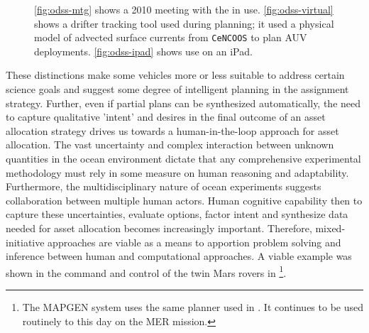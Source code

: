 \begin{figure}
\centering
{}
\caption{\small \ref{fig:odss-mtg} shows a 2010 \can meeting with the
  \od in use. \ref{fig:odss-virtual} shows a drifter tracking tool
  used during \can planning; it used a physical model of advected
  surface currents from \texttt{CeNCOOS} \cite{cencoos} to plan AUV
  deployments. \ref{fig:odss-ipad} shows \od use on an iPad.}
\label{fig:odss2}
\end{figure}


These distinctions make some vehicles more or less suitable to address
certain science goals and suggest some degree of intelligent planning
in the assignment strategy. Further, even if partial plans can be
synthesized automatically, the need to capture qualitative 'intent'
and desires in the final outcome of an asset allocation strategy
drives us towards a human-in-the-loop approach for asset
allocation. The vast uncertainty and complex interaction between
unknown quantities in the ocean environment dictate that any
comprehensive experimental methodology must rely in some measure on
human reasoning and adaptability.  Furthermore, the multidisciplinary
nature of ocean experiments suggests collaboration between multiple
human actors. Human cognitive capability then to capture these
uncertainties, evaluate options, factor intent and synthesize data
needed for asset allocation becomes increasingly important. Therefore,
mixed-initiative approaches are viable as a means to apportion problem
solving and inference between human and computational approaches. A
viable example was shown in the command and control of the twin Mars
rovers in \cite{aichang04,bresina05,bresina05a}\footnote{The MAPGEN
  system uses the same \eu planner used in \rxe. It continues to be
  used routinely to this day on the MER mission.}.

